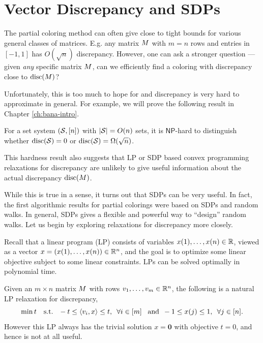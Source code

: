 \section{Vector Discrepancy and SDPs}
\label{sec:vec-herdisc}
The partial coloring method can often give close to tight bounds for various general classes of matrices. E.g. any matrix $M$ with $m=n$ rows and entries in $[-1,1]$ has $O(\sqrt{n})$ discrepancy.
However, one can ask a stronger question ---
given {\em any} specific matrix $M$, can we efficiently find a coloring with discrepancy close to $\operatorname{disc}(M)$?

\smallskip 

Unfortunately, this is too much to hope for and discrepancy is very hard to approximate in general. For example, we will prove the following result in Chapter \ref{ch:bana-intro}.
\begin{theorem}
  For a set system $(\mathcal{S}, [n])$ with $|\mathcal{S}| = O(n)$ sets, it is $\mathsf{NP}$-hard to distinguish whether  $\operatorname{disc}(\mathcal{S}) = 0$ or  $\operatorname{disc}(\mathcal{S}) = \Omega(\sqrt{n})$.
\end{theorem}

This hardness result also suggests that LP or SDP based convex programming relaxations for discrepancy are unlikely to give useful information about the actual discrepancy $\operatorname{disc}(M)$.

While this is true in a sense, it turns out that SDPs can be very useful. In fact, the first algorithmic results for partial colorings were based on SDPs and random walks. In general, SDPs gives a flexible and powerful way to ``design'' random walks. Let us begin by exploring relaxations for discrepancy more closely. 

\medskip

Recall that a linear program (LP) consists of variables $x(1),\ldots,x(n) \in \mathbb{R}$, viewed as a vector $x = (x(1),\ldots,x(n)) \in \mathbb{R}^n$, and the goal is to optimize some linear objective subject to some linear constraints. LPs can be solved optimally in polynomial time.

Given an $m\times n$ matrix $M$ with rows $v_1, \ldots, v_m \in \mathbb{R}^n$, the following is a natural LP relaxation for discrepancy,
\[ \min t \,\,\,\,  \text{ s.t. } \,\,    -t\leq  \langle v_i ,x\rangle \leq t,  \,\,\, \forall i \in [m]   \,\,\, \text{ and } \, -1 \leq x(j) \leq 1, \,\,\,\forall  j \in [n].\]
However this LP always has the trivial solution $x=\mathbf{0}$ with objective $t=0$, and hence is not at all useful.


